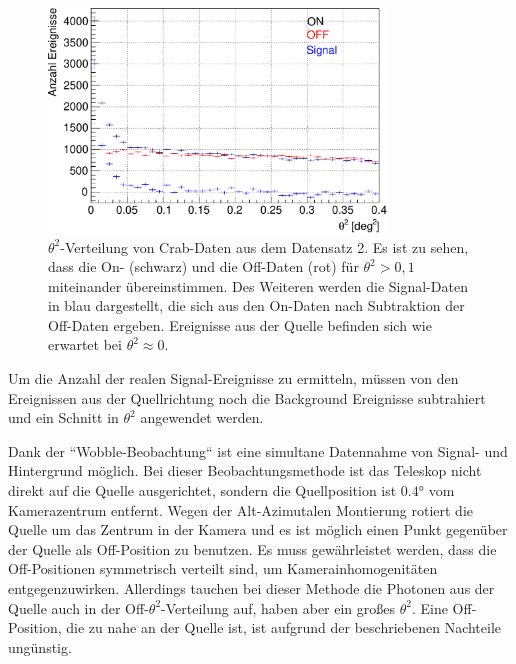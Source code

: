 \begin{figure}
    \centering
    \includegraphics[width=0.8\textwidth]{./Plots/04_MrkAnalyse/Datenset2/Crab_Theta2.pdf}
    \caption{$\theta^2$-Verteilung von Crab-Daten aus dem Datensatz 2. 
    Es ist zu sehen, dass die On- (schwarz) und die Off-Daten (rot) für $\theta^2 > 0,1$ miteinander übereinstimmen.
    Des Weiteren werden die Signal-Daten in blau dargestellt, die sich aus den On-Daten nach Subtraktion der Off-Daten ergeben.
    Ereignisse aus der Quelle befinden sich wie erwartet bei $\theta^2 \approx 0$.
    }
    \label{Crab_Theta2}
\end{figure}

Um die Anzahl der realen Signal-Ereignisse zu ermitteln, müssen von den Ereignissen aus der Quellrichtung noch die Background Ereignisse subtrahiert und ein Schnitt in $\theta^2$ angewendet werden.

Dank der ``Wobble-Beobachtung`` ist eine simultane Datennahme von Signal- und Hintergrund möglich.
Bei dieser Beobachtungsmethode ist das Teleskop nicht direkt auf die Quelle ausgerichtet, sondern die Quellposition ist $0.4°$ vom Kamerazentrum entfernt.
Wegen der Alt-Azimutalen Montierung rotiert die Quelle um das Zentrum in der Kamera und es ist möglich einen Punkt gegenüber der Quelle als Off-Position zu benutzen.
Es muss gewährleistet werden, dass die Off-Positionen symmetrisch verteilt sind, um Kamerainhomogenitäten entgegenzuwirken.
Allerdings tauchen bei dieser Methode die Photonen aus der Quelle auch in der Off-$\theta^2$-Verteilung auf, haben aber ein großes $\theta^2$.
Eine Off-Position, die zu nahe an der Quelle ist, ist aufgrund der beschriebenen Nachteile ungünstig.\cite{Lichtkurve}

